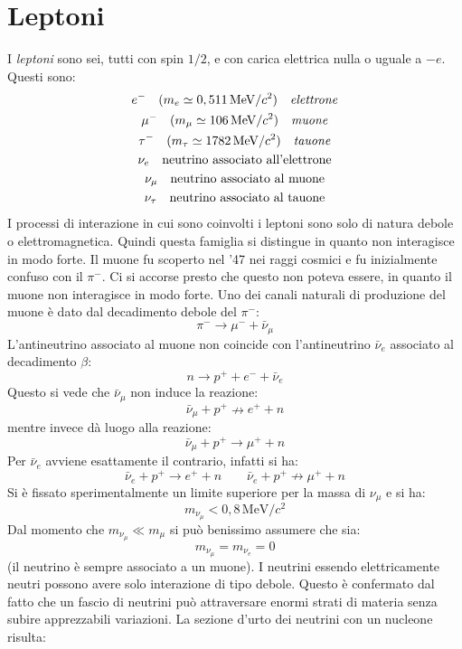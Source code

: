 \section{Leptoni}
 I \textit{leptoni} sono sei, tutti con spin $1/2$, e con carica elettrica nulla o uguale a
$-e$. Questi sono:
\begin{gather}
e^-\quad(m_e\simeq0,511\,\si{\mega\electronvolt}/c^2)\quad
\text{\textit{elettrone}}\\
\mu^-\quad(m_{\mu}\simeq
106\,\si{\mega\electronvolt}/c^2)\quad\text{\textit{muone}}\\
\tau^-\quad(m_{\tau}\simeq1782\,\si{\mega\electronvolt}/c^2)\quad\text{\textit{tauone}}\\
\nu_e\quad\text{neutrino associato all'elettrone}\\
\nu_{\mu}\quad\text{neutrino associato al muone}\\
\nu_{\tau}\quad\text{neutrino associato al tauone}
\end{gather}
I processi di interazione in cui sono coinvolti i leptoni sono solo di natura debole o elettromagnetica.
Quindi questa famiglia si distingue in quanto non interagisce in modo forte. Il muone fu scoperto nel '47 nei
raggi cosmici e fu inizialmente confuso con il $\pi^-$.
Ci si accorse presto che questo non poteva essere, in quanto il muone non interagisce in modo forte. Uno dei
canali naturali di produzione del muone è dato dal decadimento debole del $\pi^-$:
\[
\pi^-\rightarrow \mu^-+\bar{\nu}_{\mu}
\]
L'antineutrino associato al muone non coincide con l'antineutrino $\bar{\nu}_e$ associato al decadimento $\beta$:
\[
n\rightarrow p^++e^-+\bar{\nu}_e
\]
Questo si vede che $\bar{\nu}_{\mu}$ non induce la reazione:
\[
\bar{\nu}_{\mu}+p^+\nrightarrow e^++n
\]
mentre invece dà luogo alla reazione:
\[
\bar{\nu}_{\mu}+p^+\rightarrow\mu^++n
\]
Per $\bar{\nu}_e$ avviene esattamente il contrario, infatti si ha:
\[
\bar{\nu}_e+p^+\rightarrow e^++n\qquad\bar{\nu}_e+p^+\nrightarrow\mu^++n
\]
Si è fissato sperimentalmente un limite superiore per la massa di $\nu_{\mu}$ e si ha:
\[
m_{\nu_{\mu}}<0,8\,\si{\mega\electronvolt}/c^2
\]
Dal momento che $m_{\nu_{\mu}}\ll m_{\mu}$ si può benissimo assumere che sia:
\[
m_{\nu_{\mu}}=m_{\nu_e}=0
\]
(il neutrino è sempre associato a un muone). I neutrini essendo elettricamente neutri possono avere solo
interazione di tipo debole.
Questo è confermato dal fatto che un fascio di neutrini può attraversare enormi strati di materia senza
subire apprezzabili variazioni.
La sezione d'urto dei neutrini con un nucleone risulta:
